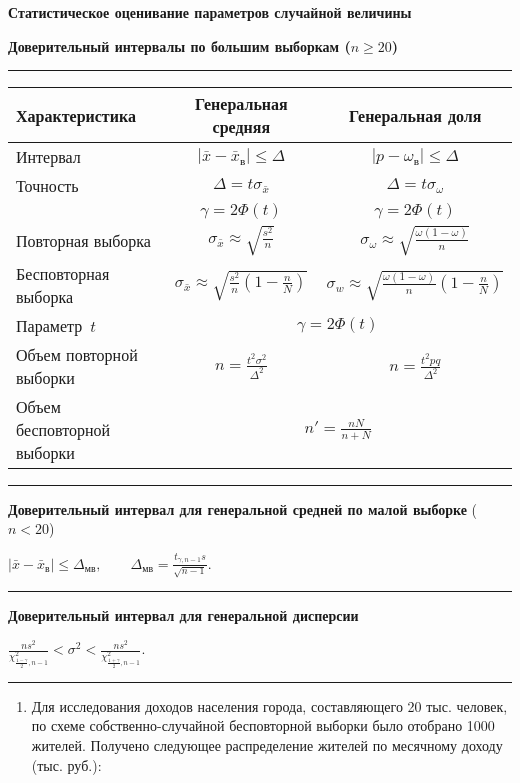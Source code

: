 \documentclass[a4paper,14pt]{extarticle}
\begin{document}
{\centering 
{
\bfseries Статистическое оценивание параметров случайной величины \par}

\bigskip

{
\textbf{Доверительный интервалы по большим выборкам ($n\geqslant 20$)}

\hrule
\begin{tabular}{lcc}
    Характеристика         & Генеральная средняя  & Генеральная доля \\
    \hline
    Интервал &$|\bar{x} - \bar{x}_\text{в}| \leqslant \Delta$ & $|p - \omega_\text{в}| \leqslant \Delta$\\
    Точность & $ \Delta = t\sigma_{\bar{x}}$ & $ \Delta = t\sigma_\omega$ \\
                          & $\gamma = 2\Phi(t)$ & $\gamma = 2\Phi(t)$ \\
    Повторная выборка& $\sigma_{\bar{x}} \approx \sqrt{\frac{s^2}{n}}$ & $\sigma_\omega  \approx \sqrt{\frac{\omega(1-\omega)}{n}}$\\ 
    Бесповторная  выборка& $\sigma_{\bar{x}} \approx \sqrt{\frac{s^2}{n}\left(1-\frac{n}{N}\right)}$& $\sigma_w  \approx \sqrt{\frac{\omega(1-\omega)}{n}\left(1-\frac{n}{N}\right)}$\\
    \hline
    Параметр~$t$ & \multicolumn{2}{c}{$\gamma = 2\Phi(t)$} \\
    Объем повторной выборки & $n=\frac{t^2\sigma^2}{\Delta^2}$ & $n=\frac{t^2pq}{\Delta^2}$\\ 
    Объем бесповторной  выборки & \multicolumn{2}{c}{$n'=\frac{nN}{n+N}$}\\ 
\end{tabular}

\hrule

\textbf{Доверительный интервал для генеральной средней по малой выборке }($n<20$)

 $|\bar{x}-\bar{x}_\text{в}|\leqslant \Delta_\text{мв},\qquad  \Delta_\text{мв}=\frac{t_{\gamma ,n-1}s}{\sqrt{n-1}}.$

 \hrule
 \textbf{Доверительный интервал для генеральной дисперсии }
 
 $\frac{{ns}^2}{\chi_{\frac{1-\gamma}{2},n-1}^2}<\sigma ^2<\frac{{ns}^2}{\chi_{\frac{1+\gamma}{2},n-1}^2}.
 $
\par}

\hrule
\begin{enumerate}
    \item Для исследования доходов населения города, составляющего 20 тыс. человек, по схеме собственно-случайной бесповторной выборки было отобрано 1000 жителей. Получено следующее распределение жителей по месячному доходу (тыс. руб.):
    

\end{enumerate}}
\end{document}
